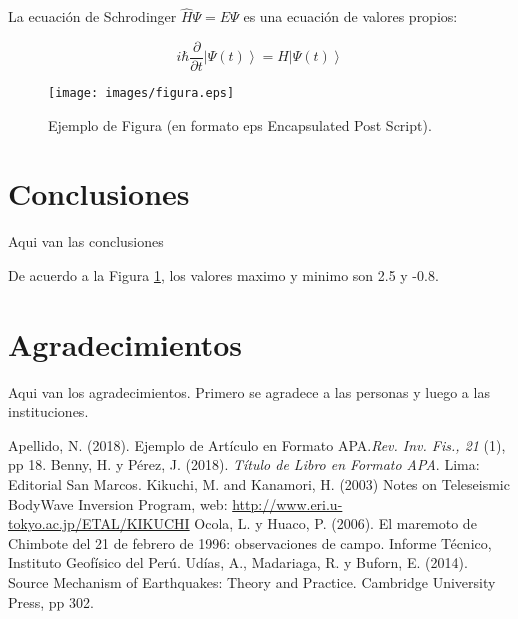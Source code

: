 \documentclass[a4paper,11pt]{article}
\begin{document}
La ecuación de Schrodinger \( \hat {H} \Psi = E \Psi \) es una ecuación de
valores propios:

\begin{equation}
	i\hbar\frac{\partial}{\partial{} t}\left|\Psi(t)\right>=H\left|\Psi(t)\right>
\end{equation}

\begin{figure}
	\centerline{\texttt{[image: images/figura.eps]}}
	\caption{Ejemplo de Figura (en formato eps Encapsulated Post Script).}
	\label{figura1}
\end{figure}

\section{Conclusiones}
Aqui van las conclusiones

De acuerdo a la Figura \ref{figura1}, los valores maximo y minimo son 2.5 y -0.8.

\section*{Agradecimientos}
Aqui van los agradecimientos. Primero se agradece a las personas y luego a las instituciones.


\begin{thebibliography}{99}
	 Apellido, N. (2018). Ejemplo de Artículo en Formato APA.\@ \emph{Rev. Inv. Fis., 21} (1), pp 18.
	 Benny, H. y Pérez, J. (2018). \emph{Título de Libro en Formato APA}. Lima: Editorial San Marcos.
	 Kikuchi, M. and Kanamori, H. (2003) Notes on Teleseismic Body\-Wave Inversion Program, web: \url{http://www.eri.u-tokyo.ac.jp/ETAL/KIKUCHI} %
	 Ocola, L. y Huaco, P. (2006). El maremoto de Chimbote del 21 de febrero de 1996: observaciones de campo. Informe Técnico, Instituto Geofísico del Perú.
	 Udías, A., Madariaga, R. y Buforn, E. (2014). Source Mechanism of Earthquakes: Theory and Practice. Cambridge University Press, pp 302.

\end{thebibliography}
\end{document}
